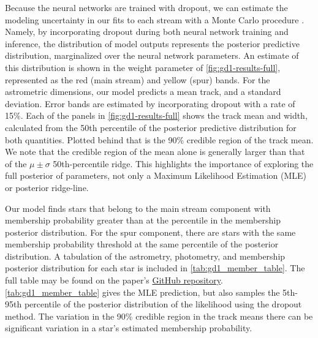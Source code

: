 \documentclass[twocolumn]{aastex631}
\begin{document}
        Because the neural networks are trained with dropout, we can estimate
        the modeling uncertainty in our fits to each stream with a Monte Carlo
        procedure \citep{GalGhahramani2015}. Namely, by incorporating dropout
        during both neural network training and inference, the distribution of
        model outputs represents the posterior predictive distribution,
        marginalized over the neural network parameters. An estimate of this
        distribution is shown in the weight parameter of
        \autoref{fig:gd1-results-full}, represented as the red (main stream) and
        yellow (spur) bands. For the astrometric dimensions, our model predicts
        a mean track, and a standard deviation. Error bands are estimated by
        incorporating dropout with a rate of 15\%. Each of the panels in
        \autoref{fig:gd1-results-full} shows the track mean and width,
        calculated from the 50th percentile of the posterior predictive
        distribution for both quantities. Plotted behind that is the 90\%
        credible region of the track mean. We note that the credible region of
        the mean alone is generally larger than that of the $\mu \pm \sigma$
        50th-percentile ridge. This highlights the importance of exploring the
        full posterior of parameters, not only a Maximum Likelihood Estimation
        (MLE) or posterior ridge-line.

        Our model finds stars
        that belong to the main stream component with membership probability
        greater than
         at the
         percentile in the
        membership posterior distribution. For the spur component, there are
         stars with the same
        membership probability threshold at the same percentile of the posterior
        distribution.  A tabulation of the astrometry, photometry, and
        membership posterior distribution for each star is included in
        \autoref{tab:gd1_member_table}. The full table may be found on the
        paper's
        \href{https://github.com/nstarman/stellar_stream_density_ml_paper}{GitHub
        repository}. \autoref{tab:gd1_member_table} gives the MLE prediction,
        but also samples the 5th-95th percentile of the posterior distribution
        of the likelihood using the dropout method. The variation in the 90\%
        credible region in the track means there can be significant variation in
        a star's estimated membership probability. 
\end{document}
